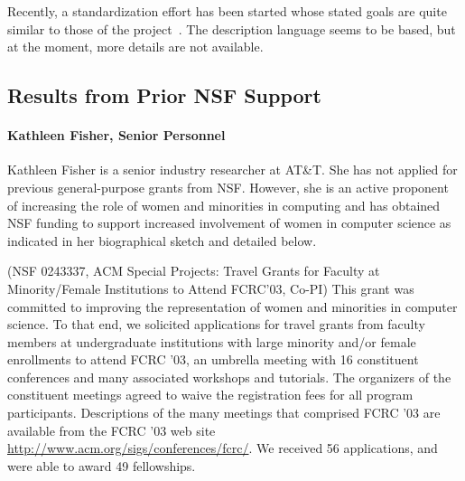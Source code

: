 \documentclass[11pt]{article}
\begin{document}
Recently, a standardization effort has been started whose stated goals are quite similar to those of the \pads{} project~\cite{dfdl}. The description
language seems to be \xml{} based, but at the moment, more details are 
not available.

\subsection{Results from Prior NSF Support}
\label{sec:results}

\paragraph*{Kathleen Fisher, Senior Personnel} 
Kathleen Fisher is a senior industry researcher at AT\&T.
She has not applied for previous general-purpose grants from NSF.
However, she is an active proponent of increasing the
role of women and minorities in computing and has
obtained NSF funding to support increased involvement of women
in computer science as indicated in her biographical sketch
and detailed below.

(NSF 0243337, ACM Special Projects: 
Travel Grants for Faculty at Minority/Female Institutions to Attend
FCRC'03, Co-PI) This grant was committed to improving the representation of women and
minorities in computer science. To that end, we solicited applications
for travel grants from faculty members at undergraduate institutions
with large minority and/or female enrollments to attend FCRC '03, an
umbrella meeting with 16 constituent conferences and many associated
workshops and tutorials.  The organizers of the constituent meetings agreed to waive
the registration fees for all program participants. 
Descriptions of the many meetings that
comprised FCRC '03 are available from the FCRC '03 web site 
\url{http://www.acm.org/sigs/conferences/fcrc/}.  We
received 56 applications, and were able to award 49
fellowships.


\end{document}
